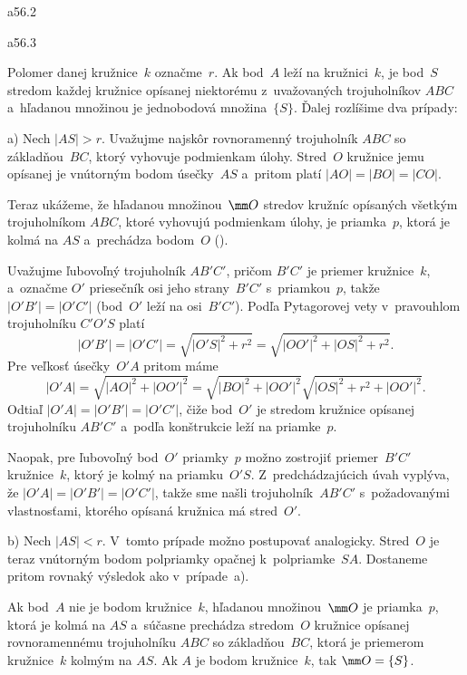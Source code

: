 {%
\epsplace a56.2 \hfil\Obr \par
\epsplace a56.3 \hfil\Obr

Polomer danej kružnice~$k$ označme~$r$. Ak bod~$A$ leží
na kružnici~$k$, je bod~$S$ stredom každej kružnice opísanej niektorému
z~uvažovaných trojuholníkov $ABC$ a~hľadanou množinou je
jednobodová množina~$\{S\}$. Ďalej rozlíšime dva prípady:

\smallskip
a) Nech $|AS|>r$. Uvažujme najskôr rovnoramenný trojuholník
$ABC$ so základňou~$BC$, ktorý vyhovuje podmienkam úlohy. Stred~$O$
kružnice jemu opísanej je vnútorným bodom úsečky~$AS$ a~pritom
platí $|AO|=|BO|=|CO|$.

Teraz ukážeme, že hľadanou množinou~$\mm O$ stredov kružníc opísaných
všetkým trojuholníkom $ABC$, ktoré vyhovujú podmienkam úlohy, je
priamka~$p$, ktorá je kolmá na $AS$ a~prechádza bodom~$O$ (\obr).

\inspicture{}

Uvažujme ľubovoľný trojuholník $AB'C'$, pričom $B'C'$ je priemer
kružnice~$k$, a~označme $O'$ priesečník osi jeho strany~$B'C'$
s~priamkou~$p$, takže $|O'B'|=|O'C'|$ (bod~$O'$ leží na
osi~$B'C'$). Podľa Pytagorovej vety v~pravouhlom trojuholníku
$C'O'S$ platí
$$
|O'B'|=|O'C'|=\sqrt{|O'S|^2+r^2}=\sqrt{|OO'|^2+|OS|^2+r^2}.
$$
Pre veľkosť úsečky~$O'A$ pritom máme
$$
|O'A|=\sqrt{|AO|^2+|OO'|^2}=\sqrt{|BO|^2+|OO'|^2}\sqrt{|OS|^2+r^2+|OO'|^2}.
$$
Odtiaľ $|O'A|=|O'B'|=|O'C'|$, čiže bod~$O'$ je stredom kružnice
opísanej trojuholníku $AB'C'$ a~podľa konštrukcie leží na priamke~$p$.

Naopak, pre ľubovoľný bod~$O'$ priamky~$p$ možno zostrojiť priemer~$B'C'$
kružnice~$k$, ktorý je kolmý na priamku~$O'S$. Z~predchádzajúcich
úvah vyplýva, že $|O'A|=|O'B'|=|O'C'|$, takže sme našli
trojuholník~$AB'C'$ s~požadovanými vlastnosťami, ktorého opísaná kružnica
má stred~$O'$.

\smallskip
b) Nech $|AS|<r$. V~tomto prípade možno postupovať analogicky.
Stred~$O$ je teraz vnútorným bodom polpriamky opačnej k~polpriamke~$SA$.
Dostaneme pritom rovnaký výsledok ako v~prípade~a).

\zaver
Ak bod~$A$ nie je bodom kružnice~$k$, hľadanou množinou~$\mm O$
je priamka~$p$, ktorá je kolmá na $AS$ a~súčasne prechádza
stredom~$O$ kružnice opísanej rovnoramennému trojuholníku $ABC$ so
základňou~$BC$, ktorá je priemerom kružnice~$k$ kolmým na $AS$.
Ak $A$ je bodom kružnice~$k$, tak $\mm O=\{S\}$.

}
